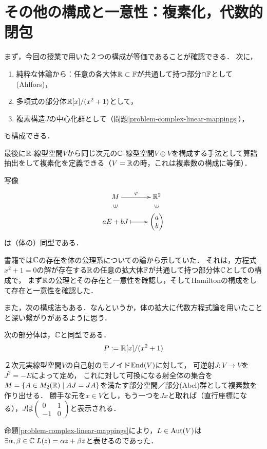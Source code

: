 \documentclass[uplatex, dvipdfmx]{jsreport}
\begin{document}
\section{その他の構成と一意性：複素化，代数的閉包}

\begin{screen}
    まず，今回の授業で用いた２つの構成が等価であることが確認できる．
    次に，
    \begin{enumerate}
        \item 純粋な体論から：任意の各大体$\mathbb{R}\subset\mathbb{F}$が共通して持つ部分$\cap\mathbb{F}$として(Ahlfors)，
        \item 多項式の部分体$\mathbb{R}[x]/(x^2+1)$として，
        \item 複素構造$J$の中心化群として（問題\ref{problem-complex-linear-mappings}），
    \end{enumerate}
    も構成できる．

    最後に$\mathbb{R}$-線型空間$V$から同じ次元の$\mathbb{C}$-線型空間$V\oplus V$を構成する手法として算譜抽出をして複素化を定義できる（$V=\mathbb{R}$の時，これは複素数の構成に等価）．
\end{screen}

\begin{proposition}[２つの構成の等価性]
    写像
    \[\xymatrix@R-2pc{
        M\ar[r]^-{\varphi}&{\R^2}\\
        {\rotatebox{90}{$\in$}}&{\rotatebox{90}{$\in$}}\\
        {aE+bJ}\ar@{|->}[r]&{\begin{pmatrix}a\\b\end{pmatrix}}
    }\]
    は（体の）同型である．
\end{proposition}

書籍\cite{Ahlfors}では$\mathbb{C}$の存在を体の公理系についての論から示していた．
それは，方程式$x^2+1=0$の解が存在する$\mathbb{R}$の任意の拡大体$\mathbb{F}$が共通して持つ部分体$\mathbb{C}$としての構成で，
まず$\mathbb{R}$の公理とその存在と一意性を確認し，そしてHamiltonの構成をして存在と一意性を確認した．


また，次の構成法もある．なんというか，体の拡大に代数方程式論を用いたことと深い繋がりがあるように思う．
\begin{problem}[多項式の部分体として]
    次の部分体は，$\mathbb{C}$と同型である．
    \[ P:=\mathbb{R}[x]/(x^2+1) \]
\end{problem}

\begin{example}
    ２次元実線型空間$V$の自己射のモノイド$\mathrm{End}(V)$に対して，
    可逆射$J:V\to V$を$J^2=-E$によって定め，
    これに対して可換になる射全体の集合を$M=\{A\in M_2(\mathbb{R})\mid AJ=JA\}$を満たす部分空間／部分(Abel)群として複素数を作り出せる．
    勝手な元を$x\in V$とし，もう一つを$Jx$と取れば（直行座標になる），$J$は$\begin{pmatrix}0&1\\-1&0\end{pmatrix}$と表示される．

    命題\ref{problem-complex-linear-mappings}により，$L\in\mathrm{Aut}(V)$は$\exists\alpha,\beta\in\mathbb{C}\;L(z)=\alpha z+\beta\overline{z}$と表せるのであった．
\end{example}
\end{document}
